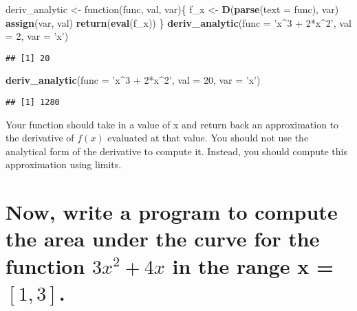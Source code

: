 \documentclass[]{article}
\newenvironment{Shaded}{\begin{snugshade}}{\end{snugshade}}
\newcommand{\KeywordTok}[1]{\textcolor[rgb]{0.13,0.29,0.53}{\textbf{{#1}}}}
\newcommand{\DataTypeTok}[1]{\textcolor[rgb]{0.13,0.29,0.53}{{#1}}}
\newcommand{\DecValTok}[1]{\textcolor[rgb]{0.00,0.00,0.81}{{#1}}}
\newcommand{\StringTok}[1]{\textcolor[rgb]{0.31,0.60,0.02}{{#1}}}
\newcommand{\NormalTok}[1]{{#1}}
\begin{document}
\begin{Shaded}
\begin{Highlighting}[]
\NormalTok{deriv_analytic <-}\StringTok{ }\NormalTok{function(func, val, var)\{}
                      \NormalTok{f_x <-}\StringTok{ }\KeywordTok{D}\NormalTok{(}\KeywordTok{parse}\NormalTok{(}\DataTypeTok{text =} \NormalTok{func), var) }
                      \KeywordTok{assign}\NormalTok{(var, val)}
                      \KeywordTok{return}\NormalTok{(}\KeywordTok{eval}\NormalTok{(f_x))}
                    \NormalTok{\}}
\KeywordTok{deriv_analytic}\NormalTok{(}\DataTypeTok{func =} \StringTok{'x^3 + 2*x^2'}\NormalTok{, }\DataTypeTok{val =} \DecValTok{2}\NormalTok{, }\DataTypeTok{var =} \StringTok{'x'}\NormalTok{)}
\end{Highlighting}
\end{Shaded}

\begin{verbatim}
## [1] 20
\end{verbatim}

\begin{Shaded}
\begin{Highlighting}[]
\KeywordTok{deriv_analytic}\NormalTok{(}\DataTypeTok{func =} \StringTok{'x^3 + 2*x^2'}\NormalTok{, }\DataTypeTok{val =} \DecValTok{20}\NormalTok{, }\DataTypeTok{var =} \StringTok{'x'}\NormalTok{)}
\end{Highlighting}
\end{Shaded}

\begin{verbatim}
## [1] 1280
\end{verbatim}

Your function should take in a value of x and return back an
approximation to the derivative of \(f(x)\) evaluated at that value. You
should not use the analytical form of the derivative to compute it.
Instead, you should compute this approximation using limits.

\section{\texorpdfstring{Now, write a program to compute the area under
the curve for the function \(3x^2+4x\) in the range x =
\([1, 3]\).}{Now, write a program to compute the area under the curve for the function 3x\^{}2+4x in the range x = {[}1, 3{]}.}}\label{now-write-a-program-to-compute-the-area-under-the-curve-for-the-function-3x24x-in-the-range-x-1-3.}
\end{document}
